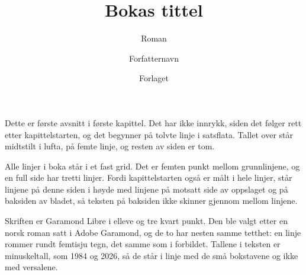 \documentclass[12pt,twoside]{book}
\begin{document}
\title{Bokas tittel}
\subtitle{Roman}
\author{Forfatternavn}
\date{Forlaget}




\booktitlepage





%
%
%

\kapittel

Dette er første avsnitt i første kapittel. Det har ikke innrykk, siden det følger rett etter kapittelstarten, og det begynner på tolvte linje i satsflata. Tallet over står midtstilt i lufta, på femte linje, og resten av siden er tom.

Alle linjer i boka står i et fast grid. Det er femten punkt mellom grunnlinjene, og en full side har tretti linjer. Fordi kapittelstarten også er målt i hele linjer, står linjene på denne siden i høyde med linjene på motsatt side av oppslaget og på baksiden av bladet, så teksten på baksiden ikke skinner gjennom mellom linjene.

Skriften er Garamond Libre i elleve og tre kvart punkt. Den ble valgt etter en norsk roman satt i Adobe Garamond, og de to har nesten samme tetthet: en linje rommer rundt femtisju tegn, det samme som i forbildet. Tallene i teksten er minuskeltall, som 1984 og 2026, så de står i linje med de små bokstavene og ikke med versalene.
\end{document}
